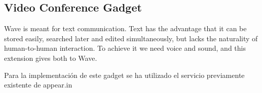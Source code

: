\subsection{Video Conference Gadget}

Wave is meant for text communication. Text has the advantage that it can be stored easily, searched later and edited simultaneously, but lacks the naturality of human-to-human interaction. To achieve it we need voice and sound, and this extension gives both to Wave.

Para la implementación de este gadget se ha utilizado el servicio previamente existente de appear.in

